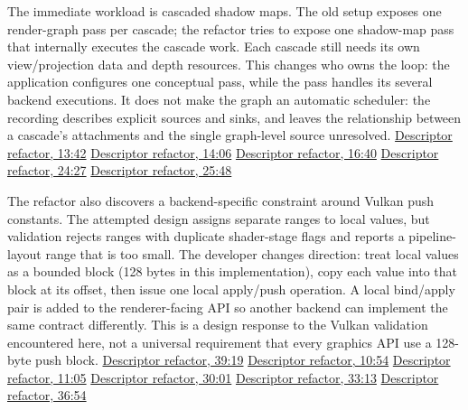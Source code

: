 The immediate workload is cascaded shadow maps. The old setup exposes one render-graph pass per cascade; the refactor tries to expose one shadow-map pass that internally executes the cascade work. Each cascade still needs its own view/projection data and depth resources. This changes who owns the loop: the application configures one conceptual pass, while the pass handles its several backend executions. It does not make the graph an automatic scheduler: the recording describes explicit sources and sinks, and leaves the relationship between a cascade's attachments and the single graph-level source unresolved. \href{https://www.youtube.com/watch?v=HahgZzF2Dfo&t=820s}{Descriptor refactor, 13:42} \href{https://www.youtube.com/watch?v=HahgZzF2Dfo&t=844s}{Descriptor refactor, 14:06} \href{https://www.youtube.com/watch?v=HahgZzF2Dfo&t=998s}{Descriptor refactor, 16:40} \href{https://www.youtube.com/watch?v=HahgZzF2Dfo&t=1464s}{Descriptor refactor, 24:27} \href{https://www.youtube.com/watch?v=HahgZzF2Dfo&t=1548s}{Descriptor refactor, 25:48}

The refactor also discovers a backend-specific constraint around Vulkan push constants. The attempted design assigns separate ranges to local values, but validation rejects ranges with duplicate shader-stage flags and reports a pipeline-layout range that is too small. The developer changes direction: treat local values as a bounded block (128 bytes in this implementation), copy each value into that block at its offset, then issue one local apply/push operation. A local bind/apply pair is added to the renderer-facing API so another backend can implement the same contract differently. This is a design response to the Vulkan validation encountered here, not a universal requirement that every graphics API use a 128-byte push block. \href{https://www.youtube.com/watch?v=HahgZzF2Dfo&t=2358s}{Descriptor refactor, 39:19} \href{https://www.youtube.com/watch?v=HahgZzF2Dfo&t=653s}{Descriptor refactor, 10:54} \href{https://www.youtube.com/watch?v=HahgZzF2Dfo&t=662s}{Descriptor refactor, 11:05} \href{https://www.youtube.com/watch?v=HahgZzF2Dfo&t=1801s}{Descriptor refactor, 30:01} \href{https://www.youtube.com/watch?v=HahgZzF2Dfo&t=1991s}{Descriptor refactor, 33:13} \href{https://www.youtube.com/watch?v=HahgZzF2Dfo&t=2212s}{Descriptor refactor, 36:54}

